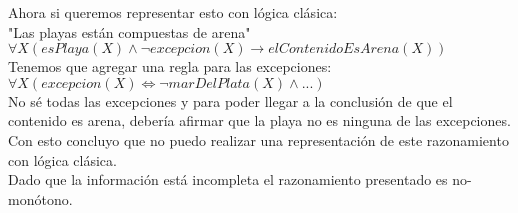 Ahora si queremos representar esto con lógica clásica: \\

"Las playas están compuestas de arena" \\

$\forall X (esPlaya(X) \land \neg excepcion(X) \longrightarrow elContenidoEsArena(X))$ \\

Tenemos que agregar una regla para las excepciones: \\

$\forall X (excepcion(X) \iff \neg marDelPlata(X) \land ... )$ \\

No sé todas las excepciones y para poder llegar a la conclusión de que el contenido es arena, debería afirmar que la playa no es ninguna de las excepciones. Con esto concluyo que no puedo realizar una representación de este razonamiento con lógica clásica. \\

Dado que la información está incompleta el razonamiento presentado es no-monótono. 

\bigskip
